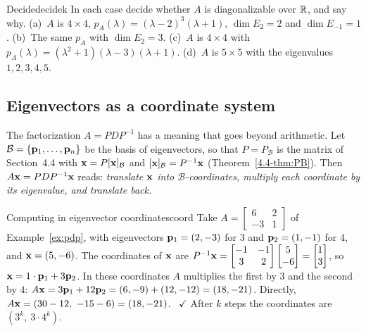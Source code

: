 \documentclass[11pt]{article}
\begin{document}
\begin{kc}{Decide}{decidek}
In each case decide whether $A$ is diagonalizable over $\mathbb{R}$, and say why. (a)~$A$ is $4\times4$, $p_A(\lambda)=(\lambda-2)^3(\lambda+1)$, $\dim E_2=2$ and $\dim E_{-1}=1$. (b)~The same $p_A$ with $\dim E_2=3$. (c)~$A$ is $4\times4$ with $p_A(\lambda)=(\lambda^2+1)(\lambda-3)(\lambda+1)$. (d)~$A$ is $5\times5$ with the eigenvalues $1,2,3,4,5$.
\end{kc}

\subsection*{Eigenvectors as a coordinate system}

The factorization $A=PDP^{-1}$ has a meaning that goes beyond arithmetic. Let $\mathcal{B}=\{\mathbf{p}_1,\dots,\mathbf{p}_n\}$ be the basis of eigenvectors, so that $P=P_{\mathcal{B}}$ is the matrix of Section~4.4 with $\mathbf{x}=P[\mathbf{x}]_{\mathcal{B}}$ and $[\mathbf{x}]_{\mathcal{B}}=P^{-1}\mathbf{x}$ (Theorem~\ref{4.4-thm:PB}). Then $A\mathbf{x}=PDP^{-1}\mathbf{x}$ reads: \emph{translate $\mathbf{x}$ into $\mathcal{B}$-coordinates, multiply each coordinate by its eigenvalue, and translate back.}

\begin{exmp}{Computing in eigenvector coordinates}{coord}
Take $A=\begin{bmatrix}6&2\\-3&1\end{bmatrix}$ of Example~\ref{ex:pdp}, with eigenvectors $\mathbf{p}_1=(2,-3)$ for $3$ and $\mathbf{p}_2=(1,-1)$ for $4$, and $\mathbf{x}=(5,-6)$. The coordinates of $\mathbf{x}$ are $P^{-1}\mathbf{x}=\begin{bmatrix}-1&-1\\3&2\end{bmatrix}\begin{bmatrix}5\\-6\end{bmatrix}=\begin{bmatrix}1\\3\end{bmatrix}$, so $\mathbf{x}=1\cdot\mathbf{p}_1+3\mathbf{p}_2$. In these coordinates $A$ multiplies the first by $3$ and the second by $4$: $A\mathbf{x}=3\mathbf{p}_1+12\mathbf{p}_2=(6,-9)+(12,-12)=(18,-21)$. Directly, $A\bv{x}=(30-12,\ -15-6)=(18,-21)$. \ $\checkmark$ After $k$ steps the coordinates are $(3^k,\ 3\cdot4^k)$.
\end{exmp}

\begin{center}
\end{center}
\end{document}
